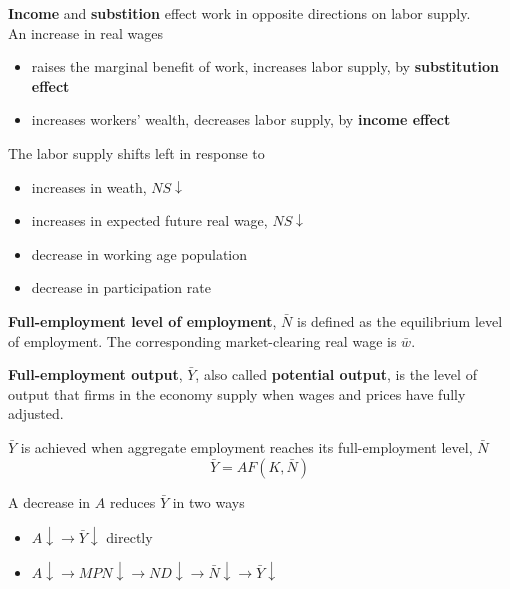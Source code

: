 \documentclass[letterpaper, 9pt,landscape]{extarticle}
\begin{document}
\begin{multicols*}{5}
\begin{remark} 
    \textbf{Income} and \textbf{substition} effect work in opposite directions on labor supply.  \\

    An increase in real wages 
    \begin{itemize}
        \item raises the marginal benefit of work, increases labor supply, by \textbf{substitution effect}
        \item increases workers' wealth, decreases labor supply, by \textbf{income effect}
    \end{itemize}   
\end{remark}


\begin{remark}
The labor supply shifts left in response to 
\begin{itemize}
    \item increases in weath, $NS \downarrow$
    \item increases in expected future real wage, $NS \downarrow$
    \item decrease in working age population
    \item decrease in participation rate
\end{itemize} 
\end{remark}

\begin{definition}
    \textbf{Full-employment level of employment}, $ \bar{N} $ is defined as the equilibrium level of employment. The corresponding market-clearing real wage is $ \bar{w} $.
\end{definition}

\begin{definition}
    \textbf{Full-employment output}, $\bar{Y}$, also called \textbf{potential output}, is the level of output that firms in the economy supply when wages and prices have fully adjusted. 

    $\bar{Y} $ is achieved when aggregate employment reaches its full-employment level, $\bar{N}$
    \[
        \bar{Y}  = AF \left( K, \bar{N}  \right) 
    \]
\end{definition}
\begin{remark}
    A decrease in $A$ reduces $\bar{Y} $ in two ways
    \begin{itemize}
        \item  $A \downarrow \rightarrow \bar{Y} \downarrow$ directly 
        \item  $A \downarrow \rightarrow MPN \downarrow \rightarrow ND \downarrow \rightarrow \bar{N} \downarrow \rightarrow \bar{Y} \downarrow $ 
    \end{itemize} 
\end{remark}


\end{multicols*}
\end{document}
